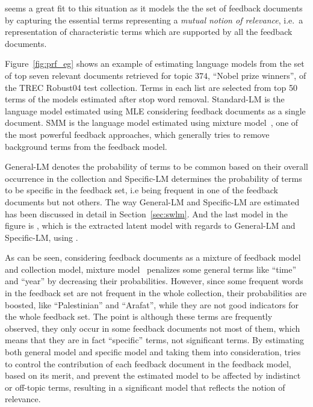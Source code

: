 \textsl{\swlm} seems a great fit to this situation as it models the the set of feedback documents by capturing the essential terms representing a \emph{mutual notion of relevance}, i.e.\ a representation of characteristic terms which are supported by all the feedback documents.


Figure~\ref{fig:prf_eg} shows an example of estimating language models from the set of top seven relevant documents retrieved for topic $374$, ``Nobel prize winners'', of the TREC Robust04 test collection.  
Terms in each list are selected from top 50 terms of the models estimated after stop word removal. 
Standard-LM is the language model estimated using MLE considering feedback documents as a single document. 
SMM is the language model estimated using mixture model~\citep{Zhai:SMM:2001}, one of the most powerful feedback approaches, which generally tries to remove background terms from the feedback model.

%
General-LM denotes the probability of terms to be common based on their overall occurrence in the collection and Specific-LM determines the probability of terms to be specific in the feedback set, i.e being frequent in one of the feedback documents but not others. 
The way General-LM and Specific-LM are estimated has been discussed in detail in Section~\ref{sec:swlm}. 
And the last model in the figure is \acswlm, which is the extracted latent model with regards to General-LM and Specific-LM, using \swlms.

As can be seen, considering feedback documents as a mixture of feedback model and collection model, mixture model~\citep{Zhai:SMM:2001} penalizes some general terms like ``time'' and ``year'' by decreasing their probabilities. However, since some frequent words in the feedback set are not frequent in the whole collection, their probabilities are boosted, like ``Palestinian'' and ``Arafat'', while they are not good indicators for the whole feedback set. The point is although these terms are frequently observed, they only occur in some feedback documents not most of them, which means that they are in fact ``specific'' terms, not significant terms.
By estimating both general model and specific model and taking them into consideration, \acswlm tries to control the contribution of each feedback document in the feedback model, based on its merit, and prevent the estimated model to be affected by indistinct or off-topic terms, resulting in a significant model that reflects the notion of relevance.

